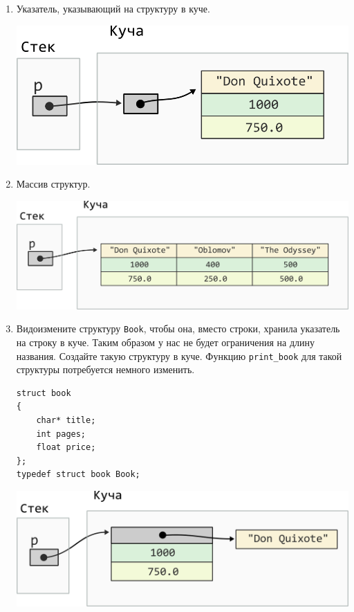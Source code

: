 \documentclass{article}
\begin{document}
\begin{enumerate}
\item Указатель, указывающий на структуру в куче.
\begin{center}
\includegraphics[scale=\mallocImagesScale]{../images/malloc_homework/05heap_pointer_struct_book.png}
\end{center}


\item Массив структур.
\begin{center}
\includegraphics[scale=\mallocImagesScale]{../images/malloc_homework/06heap_struct_book_array.png}
\end{center}

\item Видоизмените структуру \texttt{Book}, чтобы она, вместо строки, хранила указатель на строку в куче. Таким образом у нас не будет ограничения на длину названия. Создайте такую структуру в куче. Функцию \texttt{print\_book} для такой структуры потребуется немного изменить.
\begin{lstlisting}
struct book 
{
    char* title;
    int pages;
    float price;
};
typedef struct book Book;
\end{lstlisting}

\begin{center}
\includegraphics[scale=\mallocImagesScale]{../images/malloc_homework/07heap_struct_book_title_heap.png}
\end{center}


\end{enumerate}
\end{document}
